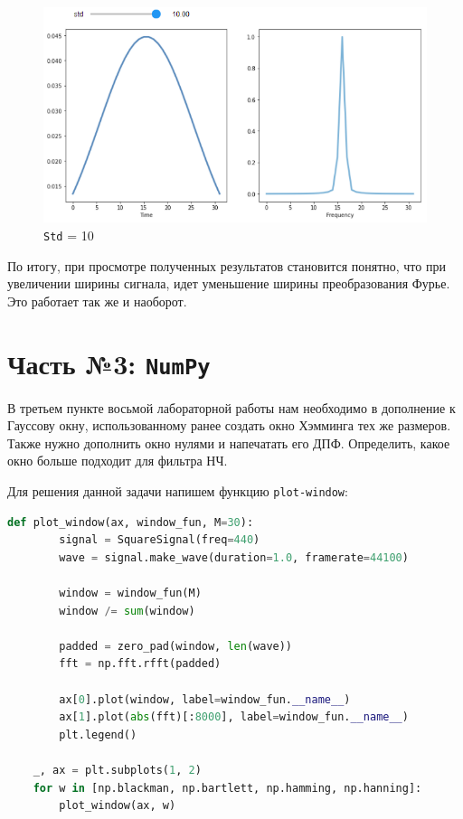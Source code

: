\documentclass[a4paper]{article}
\begin{document}
            \begin{figure}[H]
                \centering
                \includegraphics[width=\textwidth]{ex_2_std_10.png}
                \caption{\texttt{Std} = 10}
                \label{fig:ex_2_std_10}
            \end{figure}
            
            По итогу, при просмотре полученных результатов становится понятно, что при увеличении ширины сигнала, идет уменьшение ширины преобразования Фурье. Это работает так же и наоборот.
            
    \newpage
        \section{Часть №3: \texttt{NumPy}}
            В третьем пункте восьмой лабораторной работы нам необходимо в дополнение к Гауссову окну, использованному ранее создать окно Хэмминга тех же размеров. Также нужно дополнить окно нулями и напечатать его ДПФ. Определить, какое окно больше подходит для фильтра НЧ.
            
            Для решения данной задачи напишем функцию \texttt{plot-window}:
            
\begin{lstlisting}[language=Python, caption= Функция \texttt{plot-window}]
    def plot_window(ax, window_fun, M=30):
        signal = SquareSignal(freq=440)
        wave = signal.make_wave(duration=1.0, framerate=44100)
        
        window = window_fun(M)
        window /= sum(window)
        
        padded = zero_pad(window, len(wave))
        fft = np.fft.rfft(padded)
        
        ax[0].plot(window, label=window_fun.__name__)
        ax[1].plot(abs(fft)[:8000], label=window_fun.__name__)
        plt.legend()
        
    _, ax = plt.subplots(1, 2)
    for w in [np.blackman, np.bartlett, np.hamming, np.hanning]:
        plot_window(ax, w)
\end{lstlisting}
            
\end{document}
